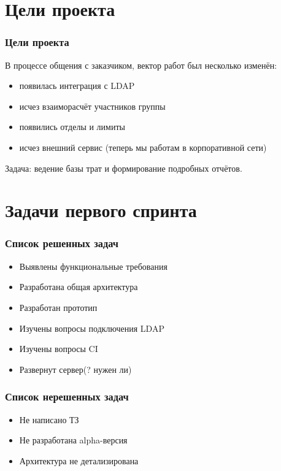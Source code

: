 \documentclass{beamer}
\newlength{\wideitemsep}
\let\olditem\item
\renewcommand{\item}{\setlength{\itemsep}{\wideitemsep}\olditem}
\begin{document}
\section{Цели проекта}

\begin{frame}
\frametitle{Цели проекта}

В процессе общения с заказчиком, вектор работ был несколько изменён:

\begin{itemize}
\item появилась интеграция с LDAP
\item исчез взаиморасчёт участников группы
\item появились отделы и лимиты
\item исчез внешний сервис (теперь мы работам в корпоративной сети)
\end{itemize}
\bigskip
Задача: ведение базы трат и формирование подробных отчётов.

\end{frame}

\section{Задачи первого спринта}

\begin{frame}
\frametitle{Список решенных задач}

\begin{itemize}
\item Выявлены функциональные требования
\item Разработана общая архитектура
\item Разработан прототип
\item Изучены вопросы подключения LDAP
\item Изучены вопросы CI
\item Развернут сервер(? нужен ли)
\end{itemize}


\end{frame}


\begin{frame}
\frametitle{Список нерешенных задач}

\begin{itemize}
\item Не написано ТЗ
\item Не разработана alpha-версия
\item Архитектура не детализирована
\end{itemize}


\end{frame}
\end{document}
